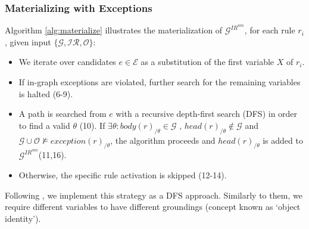 \documentclass[a4paper,UKenglish,cleveref, autoref, thm-restate]{tgdk-v2021}
\begin{document}
\subsubsection{Materializing with Exceptions} Algorithm \ref{alg:materialize} illustrates the materialization of $\mathcal{G}^{IR^{nm}}$, for each rule \textit{$r_i$}, given input $\{\mathcal{G,IR,O}\}$:
\begin{itemize}
    \item We iterate over candidates $e \in \mathcal{E}$ as a substitution of the first variable $X$ of \textit{$r_i$}.
    \item If in-graph exceptions are violated, further search for the remaining variables is halted (6-9).
    \item A path is searched from $e$ with a recursive depth-first search (DFS) in order to find a valid $\theta$ (10). If $\exists \theta: body(r)_{/\theta} \in \mathcal{G}$ , $head(r)_{/\theta} \not\in \mathcal{G}$ and $\mathcal{G} \cup \mathcal{O} \not\models exception(r)_{/\theta}$, the algorithm proceeds and $head(r)_{/\theta}$ is added to $\mathcal{G}^{IR^{nm}}$(11,16).
    \item Otherwise, the specific rule activation is skipped (12-14).  
\end{itemize}

Following \cite{meilicke_anytime_2024}, we implement this strategy as a DFS approach. Similarly to them, we require different variables to have different groundings (concept known as `object identity'). 

\newcommand{\GIRnm}{\mathcal{G}^{IR^{nm}}}
\newcommand{\G}{\mathcal{G}}
\newcommand{\E}{\mathcal{E}}
\newcommand{\Oset}{\mathcal{O}}
\end{document}
